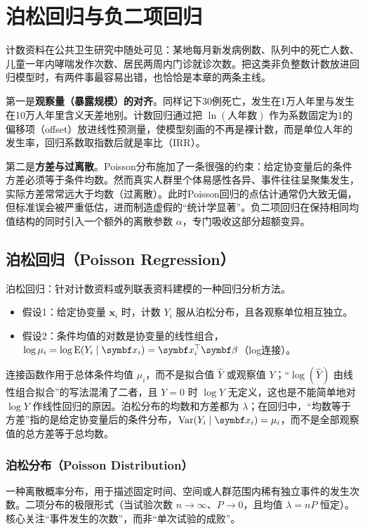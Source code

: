 \chapter{泊松回归与负二项回归}
计数资料在公共卫生研究中随处可见：某地每月新发病例数、队列中的死亡人数、儿童一年内哮喘发作次数、居民两周内门诊就诊次数。把这类非负整数计数放进回归模型时，有两件事最容易出错，也恰恰是本章的两条主线。

第一是\textbf{观察量（暴露规模）的对齐}。同样记下30例死亡，发生在1万人年里与发生在10万人年里含义天差地别。计数回归通过把 $\ln(\text{人年数})$ 作为系数固定为1的偏移项（offset）放进线性预测量，使模型刻画的不再是裸计数，而是单位人年的发生率，回归系数取指数后就是率比（IRR）。

第二是\textbf{方差与过离散}。Poisson分布施加了一条很强的约束：给定协变量后的条件方差必须等于条件均数。然而真实人群里个体易感性各异、事件往往呈聚集发生，实际方差常常远大于均数（过离散）。此时Poisson回归的点估计通常仍大致无偏，但标准误会被严重低估，进而制造虚假的“统计学显著”。负二项回归在保持相同均值结构的同时引入一个额外的离散参数 $\alpha$，专门吸收这部分超额变异。
\section{泊松回归（Poisson Regression）}
泊松回归：针对计数资料或列联表资料建模的一种回归分析方法。
\begin{itemize}
\item 假设1：给定协变量 $\bm x_i$ 时，计数 $Y_i$ 服从泊松分布，且各观察单位相互独立。
\item 假设2：条件均值的对数是协变量的线性组合，$\log\mu_i=\log\E(Y_i\mid\bm x_i)=\bm x_i^\top\bm\beta$（log连接）。
\end{itemize}
\begin{annotation}连接函数作用于总体条件均值 $\mu_i$，而不是拟合值 $\widehat Y$ 或观察值 $Y$；“$\log(\widehat Y)$ 由线性组合拟合”的写法混淆了二者，且 $Y=0$ 时 $\log Y$ 无定义，这也是不能简单地对 $\log Y$ 作线性回归的原因。泊松分布的均数和方差都为 $\lambda$；在回归中，“均数等于方差”指的是给定协变量后的条件分布，$\Var(Y_i\mid\bm x_i)=\mu_i$，而不是全部观察值的总方差等于总均数。\end{annotation}
\subsection{泊松分布（Poisson Distribution）}
一种离散概率分布，用于描述固定时间、空间或人群范围内稀有独立事件的发生次数。二项分布的极限形式（当试验次数 $n\to\infty$、$P\to0$，且均值 $\lambda=nP$ 恒定）。核心关注“事件发生的次数”，而非“单次试验的成败”。

